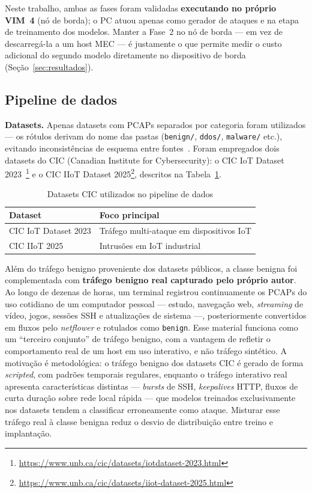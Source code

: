 \documentclass[12pt]{article}
\begin{document}
Neste trabalho, ambas as fases foram validadas \textbf{executando no próprio
VIM~4} (nó de borda); o PC atuou apenas como gerador de ataques e na etapa de
treinamento dos modelos. Manter a Fase~2 no nó de borda — em vez de descarregá-la
a um host MEC — é justamente o que permite medir o custo adicional do segundo
modelo diretamente no dispositivo de borda (Seção~\ref{sec:resultados}).

\subsection{Pipeline de dados}

\textbf{Datasets.} Apenas datasets com PCAPs separados por categoria foram
utilizados — os rótulos derivam do nome das pastas (\texttt{benign/},
\texttt{ddos/}, \texttt{malware/} etc.), evitando inconsistências de esquema
entre fontes~\cite{sharafaldin:18}. Foram empregados dois datasets do CIC
(Canadian Institute for Cybersecurity): o CIC IoT Dataset
2023~\cite{neto:23}\footnote{\url{https://www.unb.ca/cic/datasets/iotdataset-2023.html}} e o
CIC IIoT Dataset 2025\footnote{\url{https://www.unb.ca/cic/datasets/iiot-dataset-2025.html}},
descritos na Tabela~\ref{tab:datasets}.

\begin{table}[ht]
\centering
\caption{Datasets CIC utilizados no pipeline de dados}
\label{tab:datasets}
\begin{tabular}{@{}ll@{}}
\toprule
\textbf{Dataset} & \textbf{Foco principal} \\ \midrule
CIC IoT Dataset 2023 & Tráfego multi-ataque em dispositivos IoT \\
CIC IIoT 2025        & Intrusões em IoT industrial \\
\bottomrule
\end{tabular}
\end{table}

Além do tráfego benigno proveniente dos datasets públicos, a classe benigna foi
complementada com \textbf{tráfego benigno real capturado pelo próprio autor}. Ao
longo de dezenas de horas, um terminal registrou continuamente os PCAPs do uso
cotidiano de um computador pessoal — estudo, navegação web, \textit{streaming} de
vídeo, jogos, sessões SSH e atualizações de sistema —, posteriormente convertidos
em fluxos pelo \textit{netflower} e rotulados como \texttt{benign}. Esse material
funciona como um ``terceiro conjunto'' de tráfego benigno, com a vantagem de
refletir o comportamento real de um host em uso interativo, e não tráfego
sintético. A motivação é metodológica: o tráfego benigno dos datasets CIC é
gerado de forma \textit{scripted}, com padrões temporais regulares, enquanto o
tráfego interativo real apresenta características distintas — \textit{bursts} de
SSH, \textit{keepalives} HTTP, fluxos de curta duração sobre rede local rápida —
que modelos treinados exclusivamente nos datasets tendem a classificar
erroneamente como ataque. Misturar esse tráfego real à classe benigna reduz o
desvio de distribuição entre treino e implantação.
\end{document}
